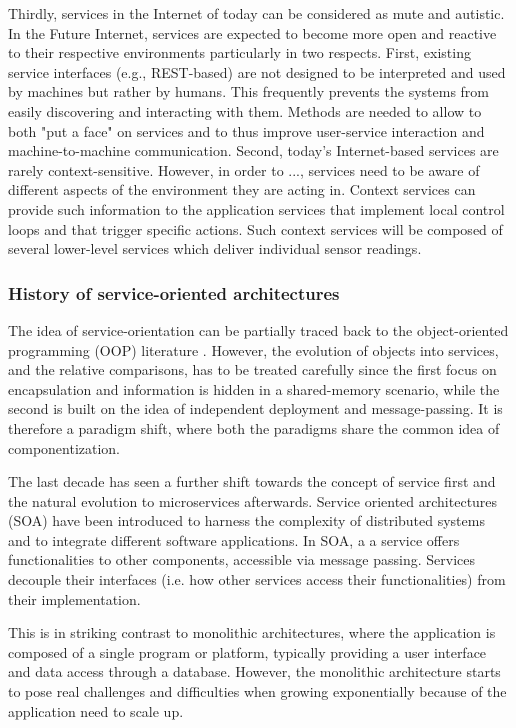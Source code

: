 \documentclass{ieeeaccess}
\begin{document}
Thirdly, services in the Internet of today can be considered as mute and autistic. In the Future Internet, services are expected to become more open and reactive to their respective environments particularly in two respects. First, existing service interfaces (e.g., REST-based) are not designed to be interpreted and used by machines but rather by humans. This frequently prevents the systems from easily discovering and interacting with them. Methods are needed to allow to both "put a face" on services and to thus improve user-service interaction and machine-to-machine communication. Second, today's Internet-based services are rarely context-sensitive. However, in order to ..., services need to be aware of different aspects of the environment they are acting in. Context services can provide such information to the application services that implement local control loops and that trigger specific actions. Such context services will be composed of several lower-level services which deliver individual sensor readings.

\subsubsection{History of service-oriented architectures}

The idea of service-orientation can be partially traced back to the object-oriented programming (OOP) literature \cite{microservices-today}. However, the evolution of objects into services, and the relative comparisons, has to be treated carefully since the first focus on encapsulation and information is hidden in a shared-memory scenario, while the second is built on the idea of independent deployment and message-passing. It is therefore a paradigm shift, where both the paradigms share the common idea of componentization.

The last decade has seen a further shift towards the concept of service first and the natural evolution to microservices afterwards. Service oriented architectures (SOA) have been introduced to harness the complexity of distributed systems and to integrate different software applications. In SOA, a a service offers functionalities to other components, accessible via message passing. Services decouple their interfaces (i.e. how other services access their functionalities) from their implementation.

This is in striking contrast to monolithic architectures, where the application is composed of a single program or platform, typically providing a user interface and data access through a database. However, the monolithic architecture starts to pose real challenges and difficulties when growing exponentially because of the application need to scale up.
\end{document}
